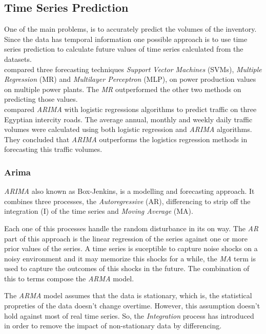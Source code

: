 \subsection{Time Series Prediction}\label{sec:tsp} One of the main problems, is
to accurately predict the volumes of the inventory. Since the data has temporal
information one possible approach is to use time series prediction to calculate
future values of time series calculated from the datasets. \\

\cite{1716527} compared three forecasting techniques \emph{Support Vector
Machines} (SVMs), \emph{Multiple Regression} (MR) and \emph{Multilayer
Perceptron} (MLP), on power production values on multiple power plants. The
\emph{MR} outperformed the other two methods on predicting those values. \\

\cite{Sabry:2007kq} compared \emph{ARIMA} with logistic regressions algorithms
to predict traffic on three Egyptian intercity roads. The average annual,
monthly and weekly daily traffic volumes were calculated using both logistic
regression and \emph{ARIMA} algorithms. They concluded that \emph{ARIMA}
outperforms the logistics regression methods in forecasting this traffic
volumes.

\subsubsection{Arima} \emph{ARIMA} also known as Box-Jenkins, is a modelling and
forecasting approach. It combines three processes, the \emph{Autoregressive}
(AR), differencing to strip off the integration (I) of the time series and
\emph{Moving Average} (MA).

Each one of this processes handle the random disturbance in its on
way.\cite{Sabry:2007kq} The \emph{AR} part of this approach is the linear
regression of the series against one or more prior values of the series. A time
series is suceptible to capture noise shocks on a noisy environment and it may
memorize this shocks for a while, the \emph{MA} term is used to capture the
outcomes of this shocks in the future.\cite{1578206} The combination of this to
terms compose the \emph{ARMA} model.

The \emph{ARMA} model assumes that the data is stationary, which is, the
statistical propreties of the data doesn't change overtime. However, this
assumption doesn't hold against most of real time series.\cite{box2013time} So,
the \emph{Integration} process has introduced in order to remove the impact of
non-stationary data by differencing.

